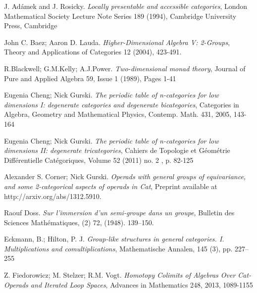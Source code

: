 \documentclass[a4paper,12pt,times,numbered,print,index]{Style/PhDThesisPSnPDF}
\numberwithin{equation}{section}
\theoremstyle{example}
\theoremstyle{named}
\begin{document}
\mainmatter

   



 

 
 
  
    

  
 \begin{thebibliography}{9}

J. Adámek and J. Rosicky.
\textit{ Locally presentable and accessible categories},
London Mathematical Society Lecture Note Series 189 (1994), Cambridge University Press, Cambridge  

John C. Baez; Aaron D. Lauda.
\textit{Higher-Dimensional Algebra V: 2-Groups},
Theory and Applications of Categories 12 (2004), 423-491.

R.Blackwell; G.M.Kelly; A.J.Power.
\textit{Two-dimensional monad theory},
Journal of Pure and Applied Algebra 59, Issue 1 (1989), Pages 1-41

Eugenia Cheng; Nick Gurski.
\textit{The periodic table of n-categories for low dimensions I: degenerate categories and degenerate bicategories},
Categories in Algebra, Geometry and Mathematical Physics, Contemp. Math. 431, 2005, 143-164

Eugenia Cheng; Nick Gurski.
\textit{The periodic table of n-categories for low dimensions II: degenerate tricategories},
Cahiers de Topologie et Géométrie Différentielle Catégoriques, Volume 52 (2011) no. 2 , p. 82-125

Alexander S. Corner; Nick Gurski.
\textit{Operads with general groups of equivariance, and some 2-categorical aspects of operads in Cat},
Preprint available at http://arxiv.org/abs/1312.5910.

Raouf Doss.
\textit{Sur l'immersion d'un semi-groupe dans un groupe},
Bulletin des Sciences Mathématiques, (2) 72, (1948). 139–150. 

Eckmann, B.; Hilton, P. J. 
\textit{Group-like structures in general categories. I. Multiplications and comultiplications},
Mathematische Annalen, 145 (3), pp. 227–255

Z. Fiedorowicz; M. Stelzer; R.M. Vogt.
\textit{Homotopy Colimits of Algebras Over
Cat-Operads and Iterated Loop Spaces},
Advances in Mathematics 248, 2013, 1089-1155
  

\end{thebibliography}
\end{document}
